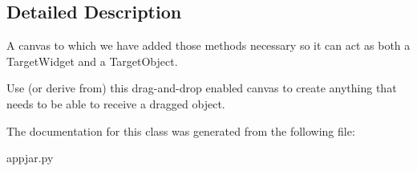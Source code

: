 \subsection{Detailed Description}
\begin{DoxyVerb}A canvas to which we have added those methods necessary so it can
    act as both a TargetWidget and a TargetObject.

Use (or derive from) this drag-and-drop enabled canvas to create anything
    that needs to be able to receive a dragged object.
\end{DoxyVerb}
 

The documentation for this class was generated from the following file\+:\begin{DoxyCompactItemize}
\item 
appjar.\+py\end{DoxyCompactItemize}
